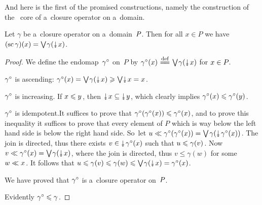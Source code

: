 \documentclass[11pt,letterpaper]{article}
\renewcommand{\thmskip}{\bigskip}
\renewcommand{\interskip}{\medskip}
\begin{document}
\txtskip

And here is the first of the promised constructions,
namely the construction of the \Scottcont\ core of a~closure operator on a~domain.

\thmskip

\begin{proposition}\label{prop:sc(gamma)-on-domain}
Let\/ $\gamma$ be a~closure operator on a~domain\/~$P\mspace{-1mu}$.
Then for all\/ $x\in P$ we have\/ $(\sccore\gamma)(x)=\tJoin\negdtinysp\gamma(\ddown x)$.
\end{proposition}

\interskip

\begin{proof}
We define the endomap~$\gamma{}^\circ$ on~$P$
	by $\gamma\inter(x)\defeq\tJoin\negdtinysp\gamma(\ddown x)$ for $x\in P\mspace{-1mu}$.

$\gamma{}^\circ$ is ascending:
    $\gamma\inter(x)
	= \tJoin\negdtinysp\gamma(\ddown x)
	\geq \tJoin\!\ddown x
	= x\tinysp$.

$\gamma{}^\circ$ is increasing.
If $x\leqslant y\mspace{1mu}$, then $\ddown x\subseteq\ddown y\tinysp$,
which clearly implies $\gamma{}^\circ(x)\leqslant\gamma{}^\circ(y)\mspace{1mu}$.

$\gamma{}^\circ$ is idempotent.\pagebreak[3]
It suffices to prove that $\gamma{}^\circ(\gamma{}^\circ(x))\leqslant\gamma{}^\circ(x)\mspace{1mu}$,
and to prove this inequality it suffices to prove
that every element of $P$ which is way below the left hand side is below the right hand side.
So~let $u \waybelow \gamma\inter(\gamma\inter(x))
		= \tJoin\negtinysp\gamma(\ddown\gamma\inter(x))\tinysp$.
The join is directed, thus there exists $v\in\ddown\gamma\inter(x)$
	such that $u\leqslant\gamma(v)\mspace{1mu}$.
Now $v\waybelow\gamma\inter(x) = \tJoin\negdtinysp\gamma(\ddown x)\tinysp$,
where the join is directed,
thus $v\leq \gamma(w)$ for some $w\ll x\mspace{1mu}$.
It follows that
    $u \leq \gamma(v) \leq \gamma(w)
	\leq \tJoin\negdtinysp\gamma(\ddown x)
	= \gamma\inter(x)$.

We have proved that $\gamma{}^\circ$ is a~closure operator on~$P\mspace{-1mu}$.

Evidently $\gamma{}^\circ\leqslant\gamma\mspace{1mu}$.


\end{proof}
\end{document}

